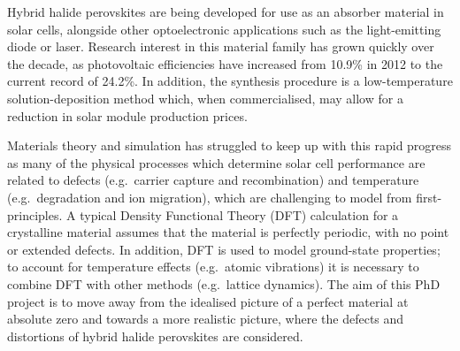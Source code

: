 Hybrid halide perovskites are being developed for use as an absorber material in solar cells, alongside other optoelectronic applications such as the light-emitting diode or laser. Research interest in this material family has grown quickly over the decade, as photovoltaic efficiencies have increased from 10.9\% in 2012 to the current record of 24.2\%.  In addition, the synthesis procedure is a low-temperature solution-deposition method which, when commercialised, may allow for a reduction in solar module production prices. 

Materials theory and simulation has struggled to keep up with this rapid progress as many of the physical processes which determine solar cell performance are related to defects (e.g.\ carrier capture and recombination) and temperature (e.g.\ degradation and ion migration), which are challenging to model from first-principles. A typical Density Functional Theory (DFT) calculation for a crystalline material assumes that the material is perfectly periodic, with no point or extended defects. In addition, DFT is used to model ground-state properties; to account for temperature effects (e.g.\ atomic vibrations) it is necessary to combine DFT with other methods (e.g.\ lattice dynamics). The aim of this PhD project is to move away from the idealised picture of a perfect material at absolute zero and towards a more realistic picture, where the defects and distortions of hybrid halide perovskites are considered.

